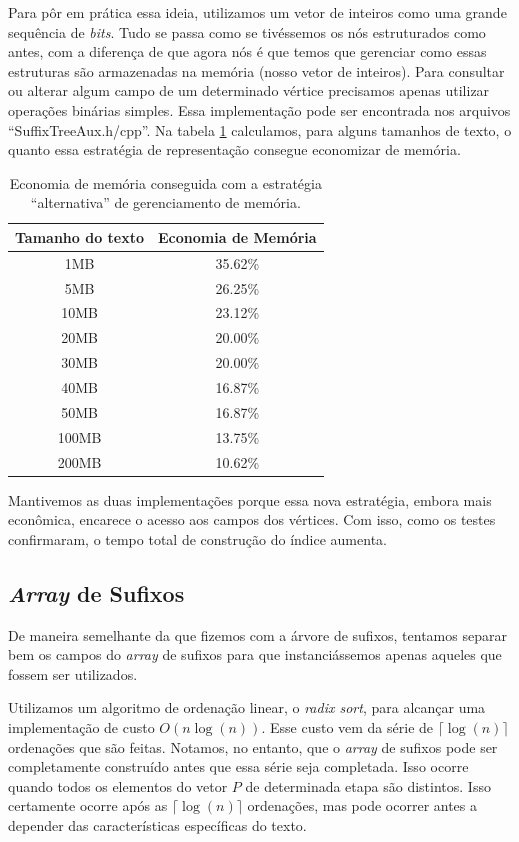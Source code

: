 \documentclass[]{article}
\begin{document}
Para pôr em prática essa ideia, utilizamos um vetor de inteiros como uma grande sequência de \textit{bits}. Tudo se passa como se tivéssemos os nós estruturados como antes, com a diferença de que agora nós é que temos que gerenciar como essas estruturas são armazenadas na memória (nosso vetor de inteiros). Para consultar ou alterar algum campo de um determinado vértice precisamos apenas utilizar operações binárias simples. Essa implementação pode ser encontrada nos arquivos ``SuffixTreeAux.h/cpp''. Na tabela \ref{tab:t1} calculamos, para alguns tamanhos de texto, o quanto essa estratégia de representação consegue economizar de memória.

\begin{table}
	\begin{center}
		\begin{tabular}{c|c}
			Tamanho do texto & Economia de Memória\\
			\hline
			1MB & 35.62\% \\
			5MB & 26.25\% \\
			10MB & 23.12\% \\
			20MB & 20.00\% \\
			30MB & 20.00\% \\
			40MB & 16.87\% \\
			50MB & 16.87\% \\
			100MB & 13.75\% \\
			200MB & 10.62\% \\
		\end{tabular}
		\caption{Economia de memória conseguida com a estratégia ``alternativa'' de gerenciamento de memória.}
		\label{tab:t1}
	\end{center}
\end{table}

Mantivemos as duas implementações porque essa nova estratégia, embora mais econômica, encarece o acesso aos campos dos vértices. Com isso, como os testes confirmaram, o tempo total de construção do índice aumenta.

\subsection{\textit{Array} de Sufixos}

De maneira semelhante da que fizemos com a árvore de sufixos, tentamos separar bem os campos do \textit{array} de sufixos para que instanciássemos apenas aqueles que fossem ser utilizados.

Utilizamos um algoritmo de ordenação linear, o \textit{radix sort}, para alcançar uma implementação de custo $O(n\log(n))$. Esse custo vem da série de $\lceil\log(n)\rceil$ ordenações que são feitas. Notamos, no entanto, que o \textit{array} de sufixos pode ser completamente construído antes que essa série seja completada. Isso ocorre quando todos os elementos do vetor $P$ de determinada etapa são distintos. Isso certamente ocorre após as $\lceil\log(n)\rceil$ ordenações, mas pode ocorrer antes a depender das características específicas do texto.
\end{document}
